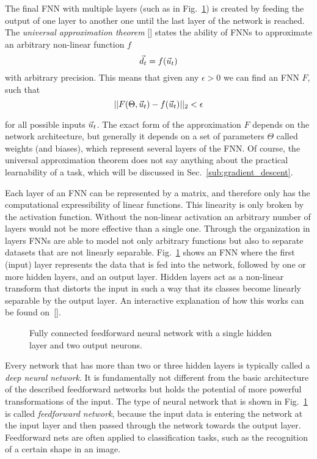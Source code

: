 The final FNN with multiple layers (such as in
Fig.~\ref{fig:feedforward_network}) is created by feeding the output of one
layer to another one until the last layer of the network is reached.  The
\emph{universal approximation theorem} [\cite{uni_approx_theorem}] states the
ability of FNNs to approximate an arbitrary non-linear function $f$
\begin{equation}
   \vec{d}_t = f(\vec{u}_t)
\end{equation}
with arbitrary precision. This means that given any $\epsilon > 0$ we can find
an FNN $F$, such that
\begin{equation}
  ||F(\Theta, \vec{u}_t) - f(\vec{u}_t)||_2 < \epsilon
\end{equation}

for all possible inputs $\vec{u}_t$. The exact form of the approximation $F$
depends on the network architecture, but generally it depends on a set of
parameters $\Theta$ called weights (and biases), which represent several layers
of the FNN.  Of course, the universal approximation theorem does not say
anything about the practical learnability of a task, which will be discussed in
Sec.~\ref{sub:gradient_descent}.

Each layer of an FNN can be represented by a matrix, and therefore only has the
computational expressibility of linear functions. This linearity is only broken
by the activation function. Without the non-linear activation an arbitrary
number of layers would not be more effective than a single one.  Through the
organization in layers FNNs are able to model not only arbitrary functions but
also to separate datasets that are not linearly separable.
Fig.~\ref{fig:feedforward_network} shows an FNN where the first (input) layer
represents the data that is fed into the network, followed by one or more
hidden layers, and an output layer.  Hidden layers act as a non-linear
transform that distorts the input in such a way that its classes become
linearly separable by the output layer.  An interactive explanation of how this
works can be found on~[\cite{colah_topology}].

\begin{figure}
  \centering
  \caption{Fully connected feedforward neural network with a single hidden
    layer and two output neurons.}
  \label{fig:feedforward_network}
\end{figure}

Every network that has more than two or three hidden layers is typically called
a \emph{deep neural network}. It is fundamentally not different from the basic
architecture of the described feedforward networks but holds the potential of
more powerful transformations of the input. The type of neural network that is
shown in Fig.~\ref{fig:feedforward_network} is called \emph{feedforward
network}, because the input data is entering the network at the input layer and
then passed through the network towards the output layer.  Feedforward nets are
often applied to classification tasks, such as the recognition of a certain
shape in an image.

